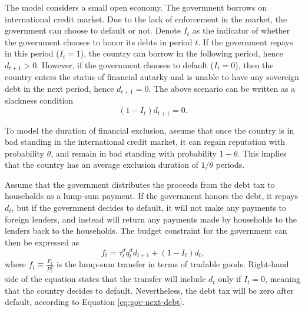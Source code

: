The model considers a small open economy. The government borrows on international credit market.
Due to the lack of enforcement in the market, the government can choose to default or not. Denote $I_t$ as the indicator of whether the government chooses to honor its debts in period $t$. If the government repays in this period ($I_{t} = 1$), the country can borrow in the following period, hence $d_{t+1} > 0$. However, if the government chooses to default ($I_t = 0$), then the country enters the status of financial autarky and is unable to have any sovereign debt in the next period, hence $d_{t+1} = 0$. The above scenario can be written as a slackness condition
\begin{equation}
    \label{eq:gov-next-debt}
    (1 - I_t)d_{t+1} = 0 .
\end{equation}

To model the duration of financial exclusion, assume that once the country is in bad standing in the international credit market, it can regain reputation with probability $\theta$, and remain in bad standing with probability $1-\theta$. This implies that the country has an average exclusion duration of $1/\theta$ periods.

Assume that the government distributes the proceeds from the debt tax to households as a lump-sum payment. If the government honors the debt, it repays $d_t$, but if the government decides to default, it will not make any payments to foreign lenders, and instead will return any payments made by households to the lenders back to the households. The budget constraint for the government can then be expressed as
\begin{equation}
    \label{eq:gov-budget}
    f_t = \tau_t^d q_t^d d_{t+1} + (1-I_t)d_t,
\end{equation}
where $f_t \equiv \frac{F_t}{P^T_t}$ is the lump-sum transfer in terms of tradable goods. Right-hand side of the equation states that the transfer will include $d_t$ only if $I_t = 0$, meaning that the country decides to default. Nevertheless, the debt tax will be zero after default, according to Equation \eqref{eq:gov-next-debt}.